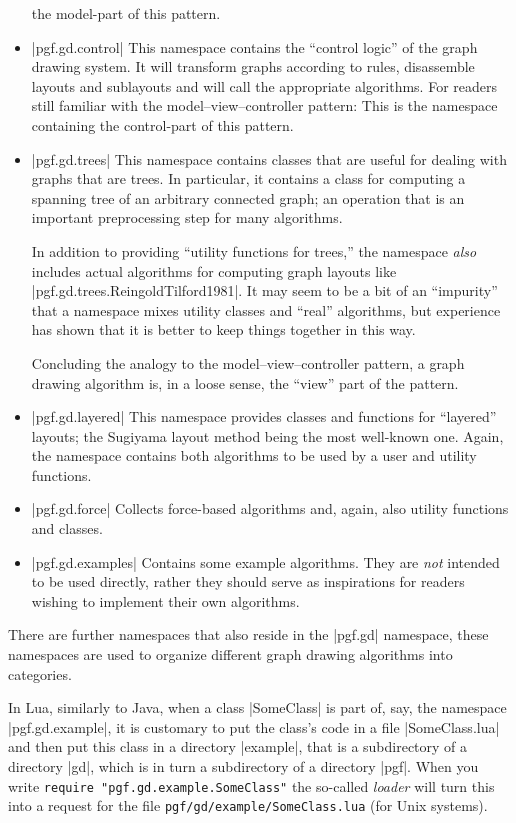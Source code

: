 \begin{itemize}
  the model-part of this pattern.
\item |pgf.gd.control| This namespace contains the ``control logic''
  of the graph drawing system. It will transform graphs according to
  rules, disassemble layouts and sublayouts and will call the
  appropriate algorithms. For readers still familiar with the
  model--view--controller pattern: This is the namespace containing
  the control-part of this pattern. 
\item |pgf.gd.trees| This namespace contains classes that are useful
  for dealing with graphs that are trees. In particular, it contains a
  class for computing a spanning tree of an arbitrary connected graph;
  an operation that is an important preprocessing step for many
  algorithms.

  In addition to providing ``utility functions for trees,'' the
  namespace \emph{also} includes actual algorithms for computing graph
  layouts like |pgf.gd.trees.ReingoldTilford1981|. It may seem to be a
  bit of an ``impurity'' that a namespace mixes utility classes and
  ``real'' algorithms, but experience has shown that it is better to
  keep things together in this way.

  Concluding the analogy to the model--view--controller pattern, a
  graph drawing algorithm is, in a loose sense, the ``view'' part of
  the pattern.
\item |pgf.gd.layered| This namespace provides classes and functions
  for ``layered'' layouts; the Sugiyama layout method being the most
  well-known one. Again, the namespace contains both algorithms to be
  used by a user and utility functions.
\item |pgf.gd.force| Collects force-based algorithms and, again, also
  utility functions and classes.
\item |pgf.gd.examples| Contains some example algorithms. They are
  \emph{not} intended to be used directly, rather they should serve as
  inspirations for readers wishing to implement their own algorithms.
\end{itemize}

There are further namespaces that also reside in the |pgf.gd|
namespace, these namespaces are used to organize different graph
drawing algorithms into categories.

In Lua, similarly to Java, when a class |SomeClass| is part of, say,
the namespace |pgf.gd.example|, it is customary to put the class's
code in a file |SomeClass.lua| and then put this class in a directory
|example|, that is a subdirectory of a directory |gd|, which is in
turn a subdirectory of a directory |pgf|. When you write
\texttt{require "pgf.gd.example.SomeClass"} the so-called
\emph{loader} will turn this into a request for the file
\texttt{pgf/gd/example/SomeClass.lua} (for Unix systems).



